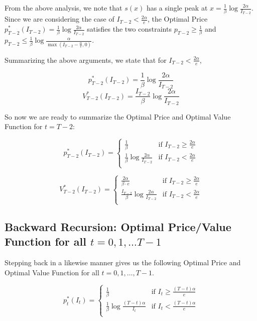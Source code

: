 \documentclass[12pt]{amsart}
\begin{document}
From the above analysis, we note that $s(x)$ has a single peak at $x = \frac 1 \beta \log \frac {2 \alpha} {I_{T-2}}$. Since we are considering the case of $I_{T-2} < \frac {2 \alpha} e$, the Optimal Price $p_{T-2}^*(I_{T-2}) = \frac 1 \beta \log \frac {2 \alpha} {I_{T-2}}$ satisfies the two constraints $p_{T-2} \geq \frac 1 \beta$ and $p_{T-2} \leq \frac 1 \beta \log \frac \alpha {\max(I_{T-2} - \frac \alpha e, 0)}$. 

Summarizing the above arguments, we state that for $I_{T-2} < \frac {2 \alpha} e$,

$$p_{T-2}^*(I_{T-2}) = \frac 1 \beta \log \frac {2 \alpha} {I_{T-2}}$$
$$V_{T-2}^*(I_{T-2}) = \frac {I_{T-2}} \beta \log \frac {2 \alpha} {I_{T-2}}$$

So now we are ready to summarize the Optimal Price and Optimal Value Function for $t = T-2$:

$$
p_{T-2}^*(I_{T-2}) = 
\begin{cases}
\frac 1 \beta & \text{if } I_{T-2} \geq \frac {2 \alpha} e \\
\frac 1 \beta \log{ \frac {2 \alpha} {I_{T-2}}} & \text{if } I_{T-2} < \frac {2 \alpha} e\\
\end{cases}
$$

$$
V_{T-2}^*(I_{T-2}) = 
\begin{cases}
\frac {2 \alpha} {\beta \cdot e} & \text{if } I_{T-2} \geq \frac {2 \alpha} e \\
\frac {I_{T-2}} {\beta} \log{ \frac {2 \alpha} {I_{T-2}}} & \text{if } I_{T-2} < \frac {2 \alpha} e\\
\end{cases}
$$

\subsection{Backward Recursion: Optimal Price/Value Function for all $t = 0, 1, \ldots T-1$} 
   
Stepping back in a likewise manner gives us the following Optimal Price and Optimal Value Function for all $t = 0, 1, \ldots, T-1$.

$$
p_t^*(I_t) = 
\begin{cases}
\frac 1 \beta & \text{if } I_t \geq \frac {(T-t) \alpha} e \\
\frac 1 \beta \log{ \frac {(T-t) \alpha} {I_t}} & \text{if } I_t < \frac {(T-t) \alpha} e\\
\end{cases}
$$
\end{document}
